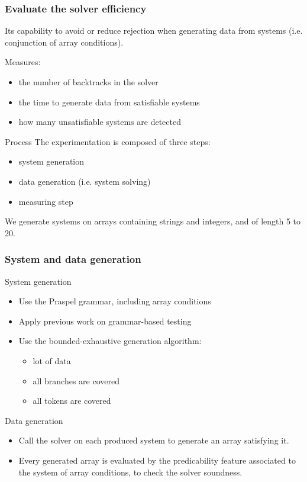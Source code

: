 \documentclass[9pt]{beamer}
\begin{document}
\begin{frame}
\frametitle{Evaluate the solver efficiency}

Its capability to avoid or reduce rejection when generating data from systems
(i.e. conjunction of array conditions).

Measures:
\begin{itemize}
\item the number of backtracks in the solver
\item the time to generate data from satisfiable systems
\item how many unsatisfiable systems are detected
\end{itemize}

\begin{block}{Process}
The experimentation is composed of three steps:
\begin{itemize}
\item system generation
\item data generation (i.e. system solving)
\item measuring step
\end{itemize}
We generate systems on arrays containing strings and integers, and of length 5
to 20.
\end{block}

\end{frame}

\begin{frame}
\frametitle{System and data generation}

\begin{block}{System generation}
\begin{itemize}
\item Use the Praspel grammar, including array conditions
\item Apply previous work on grammar-based testing
\item Use the bounded-exhaustive generation algorithm:
\begin{itemize}
\item lot of data
\item all branches are covered
\item all tokens are covered
\end{itemize}
\end{itemize}
\end{block}

\begin{block}{Data generation}
\begin{itemize}
\item Call the solver on each produced system to generate an array satisfying
it.
\item Every generated array is evaluated by the predicability feature associated
to the system of array conditions, to check the solver soundness.
\end{itemize}
\end{block}

\end{frame}
\end{document}
